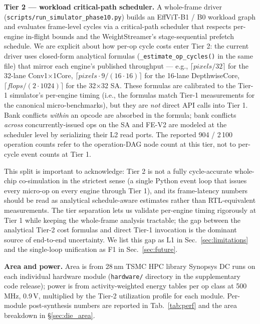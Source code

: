 \documentclass[journal]{IEEEtran}
\begin{document}
\textbf{Tier 2 --- workload critical-path scheduler.}
A whole-frame driver (\texttt{scripts/run\_simulator\_phase10.py}) builds an EffViT-B1 / B0 workload graph and evaluates frame-level cycles via a critical-path scheduler that respects per-engine in-flight bounds and the WeightStreamer's stage-sequential prefetch schedule. We are explicit about how per-op cycle costs enter Tier 2: the current driver uses closed-form analytical formulas (\texttt{\_estimate\_op\_cycles()} in the same file) that mirror each engine's published throughput --- e.g., $\lceil pixels / 32 \rceil$ for the 32-lane Conv1$\times$1Core, $\lceil pixels \cdot 9 / (16 \cdot 16) \rceil$ for the 16-lane DepthwiseCore, $\lceil flops / (2 \cdot 1024) \rceil$ for the 32$\times$32 SA. These formulas are calibrated to the Tier-1 simulator's per-engine timing (i.e., the formulas match Tier-1 measurements for the canonical micro-benchmarks), but they are \emph{not} direct API calls into Tier 1. Bank conflicts \emph{within} an opcode are absorbed in the formula; bank conflicts \emph{across} concurrently-issued ops on the SA and FE-V2 are modeled at the scheduler level by serializing their L2 read ports. The reported 904 / 2\,100 operation counts refer to the operation-DAG node count at this tier, not to per-cycle event counts at Tier 1.

This split is important to acknowledge: Tier 2 is not a fully cycle-accurate whole-chip co-simulation in the strictest sense (a single Python event loop that issues every micro-op on every engine through Tier 1), and its frame-latency numbers should be read as analytical schedule-aware estimates rather than RTL-equivalent measurements. The tier separation lets us validate per-engine timing rigorously at Tier 1 while keeping the whole-frame analysis tractable; the gap between the analytical Tier-2 cost formulas and direct Tier-1 invocation is the dominant source of end-to-end uncertainty. We list this gap as L1 in Sec.~\ref{sec:limitations} and the single-loop unification as F1 in Sec.~\ref{sec:future}.

\textbf{Area and power.}
Area is from 28\,nm TSMC HPC library Synopsys DC runs on each individual hardware module (\texttt{hardware/} directory in the supplementary code release); power is from activity-weighted energy tables per op class at 500\,MHz, 0.9\,V, multiplied by the Tier-2 utilization profile for each module. Per-module post-synthesis numbers are reported in Tab.~\ref{tab:perf} and the area breakdown in \S\ref{sec:die_area}.
\end{document}
